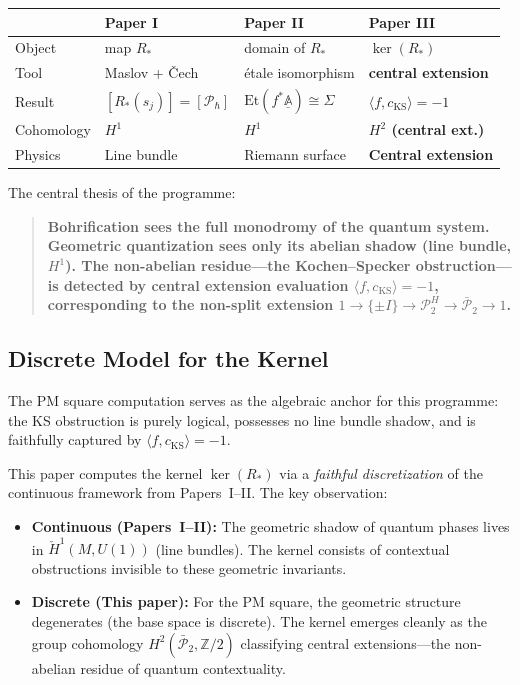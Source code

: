 \documentclass[11pt]{article}
\begin{document}
\begin{center}
\renewcommand{\arraystretch}{1.4}
\begin{tabular}{lp{2.3cm}p{2.7cm}p{3.2cm}}
\toprule
& Paper I & Paper II & Paper III \\
\midrule
Object & map $R_*$ & domain of $R_*$ & $\ker(R_*)$ \\
Tool & Maslov + \v{C}ech & \'etale isomorphism & \textbf{central extension} \\
Result & $[R_*(s_j)] = [\mathcal{P}_\hbar]$ & $\mathrm{Et}(f^*\underline{\mathbb{A}}) \cong \Sigma$ & $\langle f, c_{\mathrm{KS}} \rangle = -1$ \\
Cohomology & $H^1$ & $H^1$ & \textbf{$H^2$ (central ext.)} \\
Physics & Line bundle & Riemann surface & \textbf{Central extension} \\
\bottomrule
\end{tabular}
\end{center}

The central thesis of the programme:

\begin{quote}
\textbf{Bohrification sees the full monodromy of the quantum system.
Geometric quantization sees only its abelian shadow (line bundle, $H^1$).
The non-abelian residue---the Kochen--Specker obstruction---is detected
by central extension evaluation $\langle f, c_{\mathrm{KS}} \rangle = -1$,
corresponding to the non-split extension $1 \to \{\pm I\} \to \mathcal{P}_2^H \to
\bar{\mathcal{P}}_2 \to 1$.}
\end{quote}

\subsection{Discrete Model for the Kernel}

The PM square computation serves as the algebraic anchor for this programme:
the KS obstruction is purely logical, possesses no line bundle shadow,
and is faithfully captured by $\langle f, c_{\mathrm{KS}} \rangle = -1$.

This paper computes the kernel $\ker(R_*)$ via a \emph{faithful discretization}
of the continuous framework from Papers~I--II. The key observation:

\begin{itemize}
  \item \textbf{Continuous (Papers~I--II):} The geometric shadow of quantum
        phases lives in $\check{H}^1(M, U(1))$ (line bundles). The kernel
        consists of contextual obstructions invisible to these geometric
        invariants.

  \item \textbf{Discrete (This paper):} For the PM square, the geometric
        structure degenerates (the base space is discrete). The kernel emerges
        cleanly as the group cohomology $H^2(\bar{\mathcal{P}}_2, \mathbb{Z}/2)$
        classifying central extensions---the non-abelian residue of quantum
        contextuality.
\end{itemize}
\end{document}
